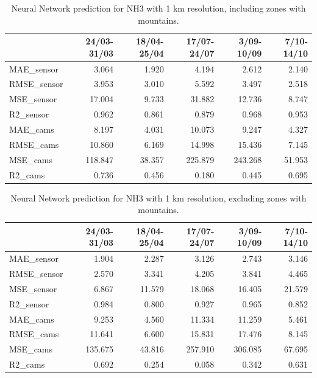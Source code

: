 \begin{table}[H]
\begin{tabular}{lrrrrr}
\toprule
 &  24/03-31/03 &  18/04-25/04 &  17/07-24/07 &  3/09-10/09 &  7/10-14/10 \\
\midrule
 MAE\_sensor &        3.064 &        1.920 &        4.194 &       2.612 &       2.140 \\
RMSE\_sensor &        3.953 &        3.010 &        5.592 &       3.497 &       2.518 \\
 MSE\_sensor &       17.004 &        9.733 &       31.882 &      12.736 &       8.747 \\
  R2\_sensor &        0.962 &        0.861 &        0.879 &       0.968 &       0.953 \\
   MAE\_cams &        8.197 &        4.031 &       10.073 &       9.247 &       4.327 \\
  RMSE\_cams &       10.860 &        6.169 &       14.998 &      15.436 &       7.145 \\
   MSE\_cams &      118.847 &       38.357 &      225.879 &     243.268 &      51.953 \\
    R2\_cams &        0.736 &        0.456 &        0.180 &       0.445 &       0.695 \\
\bottomrule
\end{tabular}
\caption{Neural Network prediction for NH3 with 1 km resolution, including zones with mountains.}
\end{table}


\begin{table}[H]
\begin{tabular}{lrrrrr}
\toprule
 &  24/03-31/03 &  18/04-25/04 &  17/07-24/07 &  3/09-10/09 &  7/10-14/10 \\
\midrule
 MAE\_sensor &        1.904 &        2.287 &        3.126 &       2.743 &       3.146 \\
RMSE\_sensor &        2.570 &        3.341 &        4.205 &       3.841 &       4.465 \\
 MSE\_sensor &        6.867 &       11.579 &       18.068 &      16.405 &      21.579 \\
  R2\_sensor &        0.984 &        0.800 &        0.927 &       0.965 &       0.852 \\
   MAE\_cams &        9.253 &        4.560 &       11.334 &      11.259 &       5.461 \\
  RMSE\_cams &       11.641 &        6.600 &       15.831 &      17.476 &       8.145 \\
   MSE\_cams &      135.675 &       43.816 &      257.910 &     306.085 &      67.695 \\
    R2\_cams &        0.692 &        0.254 &        0.058 &       0.342 &       0.631 \\
\bottomrule
\end{tabular}
\caption{Neural Network prediction for NH3 with 1 km resolution, excluding zones with mountains.}
\end{table}










